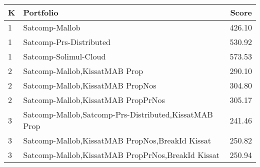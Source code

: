 \begin{tabular}{l|p{.9\linewidth}|r}
\toprule
K & Portfolio & Score \\
\midrule
1 & Satcomp-Mallob & 426.10 \\
1 & Satcomp-Prs-Distributed & 530.92 \\
1 & Satcomp-Solimul-Cloud & 573.53 \\
2 & Satcomp-Mallob,KissatMAB Prop & 290.10 \\
2 & Satcomp-Mallob,KissatMAB PropNos & 304.80 \\
2 & Satcomp-Mallob,KissatMAB PropPrNos & 305.17 \\
3 & Satcomp-Mallob,Satcomp-Prs-Distributed,KissatMAB Prop & 241.46 \\
3 & Satcomp-Mallob,KissatMAB PropNos,BreakId Kissat & 250.82 \\
3 & Satcomp-Mallob,KissatMAB PropPrNos,BreakId Kissat & 250.94 \\
\bottomrule
\end{tabular}
